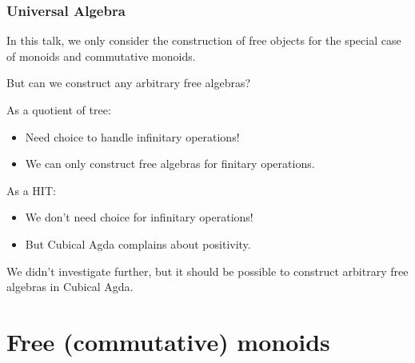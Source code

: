 \documentclass[9pt]{beamer}
\begin{document}
\begin{frame}
\frametitle{Universal Algebra}
In this talk, we only consider the construction of free objects for the special case of \alert{monoids} and \alert{commutative monoids}.

But can we construct any arbitrary free algebras?

As a quotient of tree:
\begin{itemize}
  \item Need choice to handle \alert{infinitary} operations!
  \item We can only construct free algebras for \alert{finitary} operations.  
\end{itemize} 

As a HIT:
\begin{itemize}
  \item We \alert{don't} need choice for \alert{infinitary} operations!
  \item But Cubical Agda complains about positivity.
\end{itemize}

We didn't investigate further, but it should be possible to construct arbitrary free algebras
in Cubical Agda.

\end{frame}

\section{Free (commutative) monoids}
\end{document}
